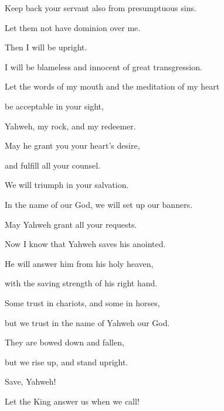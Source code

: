 {\par }{\BB \par }{\Q {}Keep back your servant also from presumptuous sins.
\par }{\QB Let them not have dominion over me.
\par }{\Q Then I will be upright.
\par }{\QB I will be blameless and innocent of great transgression.
\par }{\Q {}Let the words of my mouth and the meditation of my heart
\par }{\QB be acceptable in your sight,
\par }{\QB Yahweh, my rock, and my redeemer.

\par }
{\Q {}May he grant you your heart’s desire,
\par }{\QB and fulfill all your counsel.
\par }{\Q {}We will triumph in your salvation.
\par }{\QB In the name of our God, we will set up our banners.
\par }{\QB May Yahweh grant all your requests.
\par }{\Q {}Now I know that Yahweh saves his anointed.
\par }{\QB He will answer him from his holy heaven,
\par }{\QB with the saving strength of his right hand.
\par }{\Q {}Some trust in chariots, and some in horses,
\par }{\QB but we trust in the name of Yahweh our God.
\par }{\Q {}They are bowed down and fallen,
\par }{\QB but we rise up, and stand upright.
\par }{\Q {}Save, Yahweh!
\par }{\QB Let the King answer us when we call!

\par }
